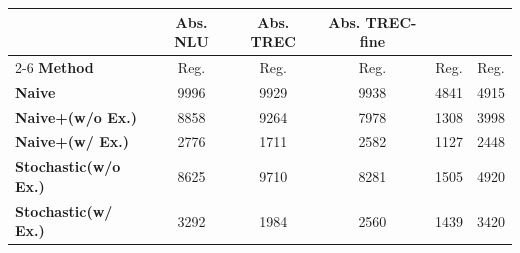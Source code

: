 \documentclass{article}
\theoremstyle{plain}
\theoremstyle{definition}
\theoremstyle{remark}
\newcommand{\trec}{TREC\xspace}
\newcommand{\trecfine}{TREC-fine\xspace}
\newcommand{\nlu}{NLU\xspace}
\newcommand{\naiveshort}{Naive\xspace}
\newcommand{\naiveplusshort}{Naive+\xspace}
\newcommand{\expshort}{Stochastic\xspace}
\begin{document}
\begin{table}[t]
{\begin{tabular}{l c  c  c  c  c}
    & \textbf{Abs. \nlu}
    & \textbf{Abs. \trec}
    & \textbf{Abs. \trecfine} \\
  \cmidrule(lr){2-6}
  \textbf{Method}
  & Reg.
  & Reg.
  & Reg.
  & Reg.
  & Reg. \\
  \midrule
  \textbf{\naiveshort}               & 9996  & 9929  & 9938  & 4841  & 4915 \\
  \textbf{\naiveplusshort (w/o Ex.)}  & 8858  & 9264  & 7978  & 1308  & 3998 \\
  \textbf{\naiveplusshort (w/ Ex.)}   & 2776  & 1711  & 2582  & 1127  & 2448 \\
  \textbf{\expshort (w/o Ex.)}        & 8625  & 9710  & 8281  & 1505  & 4920 \\
  \textbf{\expshort (w/ Ex.)}         & 3292  & 1984  & 2560  & 1439  & 3420 \\
  \bottomrule
  \end{tabular}
}
\end{table}
\end{document}
